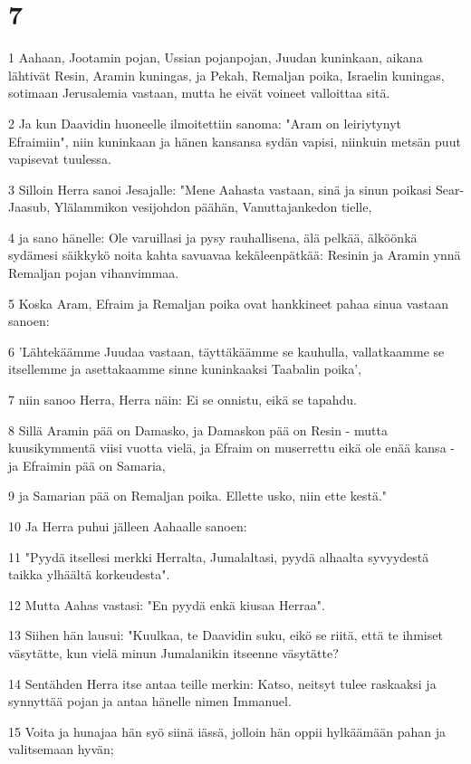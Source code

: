\chapter{7}

\par 1 Aahaan, Jootamin pojan, Ussian pojanpojan, Juudan kuninkaan, aikana lähtivät Resin, Aramin kuningas, ja Pekah, Remaljan poika, Israelin kuningas, sotimaan Jerusalemia vastaan, mutta he eivät voineet valloittaa sitä.
\par 2 Ja kun Daavidin huoneelle ilmoitettiin sanoma: "Aram on leiriytynyt Efraimiin", niin kuninkaan ja hänen kansansa sydän vapisi, niinkuin metsän puut vapisevat tuulessa.
\par 3 Silloin Herra sanoi Jesajalle: "Mene Aahasta vastaan, sinä ja sinun poikasi Sear-Jaasub, Ylälammikon vesijohdon päähän, Vanuttajankedon tielle,
\par 4 ja sano hänelle: Ole varuillasi ja pysy rauhallisena, älä pelkää, älköönkä sydämesi säikkykö noita kahta savuavaa kekäleenpätkää: Resinin ja Aramin ynnä Remaljan pojan vihanvimmaa.
\par 5 Koska Aram, Efraim ja Remaljan poika ovat hankkineet pahaa sinua vastaan sanoen:
\par 6 'Lähtekäämme Juudaa vastaan, täyttäkäämme se kauhulla, vallatkaamme se itsellemme ja asettakaamme sinne kuninkaaksi Taabalin poika',
\par 7 niin sanoo Herra, Herra näin: Ei se onnistu, eikä se tapahdu.
\par 8 Sillä Aramin pää on Damasko, ja Damaskon pää on Resin - mutta kuusikymmentä viisi vuotta vielä, ja Efraim on muserrettu eikä ole enää kansa - ja Efraimin pää on Samaria,
\par 9 ja Samarian pää on Remaljan poika. Ellette usko, niin ette kestä."
\par 10 Ja Herra puhui jälleen Aahaalle sanoen:
\par 11 "Pyydä itsellesi merkki Herralta, Jumalaltasi, pyydä alhaalta syvyydestä taikka ylhäältä korkeudesta".
\par 12 Mutta Aahas vastasi: "En pyydä enkä kiusaa Herraa".
\par 13 Siihen hän lausui: "Kuulkaa, te Daavidin suku, eikö se riitä, että te ihmiset väsytätte, kun vielä minun Jumalanikin itseenne väsytätte?
\par 14 Sentähden Herra itse antaa teille merkin: Katso, neitsyt tulee raskaaksi ja synnyttää pojan ja antaa hänelle nimen Immanuel.
\par 15 Voita ja hunajaa hän syö siinä iässä, jolloin hän oppii hylkäämään pahan ja valitsemaan hyvän;
